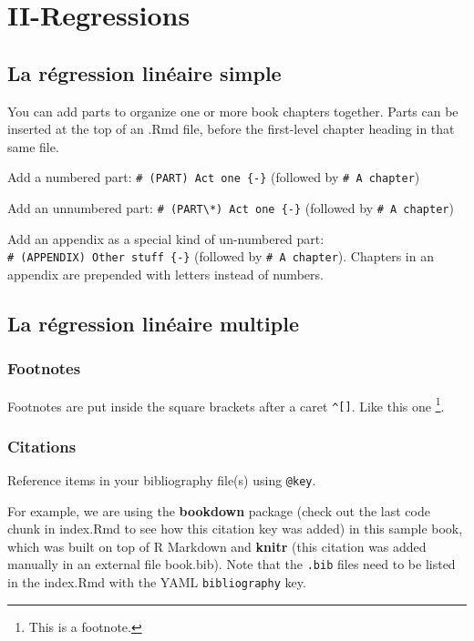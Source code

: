 \documentclass[
]{book}
\theoremstyle{definition}
\theoremstyle{definition}
\theoremstyle{definition}
\theoremstyle{definition}
\theoremstyle{remark}
\begin{document}
\hypertarget{part-ii-regressions}{%
\part{II-Regressions}\label{part-ii-regressions}}

\hypertarget{simple-lm}{%
\chapter{La régression linéaire simple}\label{simple-lm}}

You can add parts to organize one or more book chapters together. Parts can be inserted at the top of an .Rmd file, before the first-level chapter heading in that same file.

Add a numbered part: \texttt{\#\ (PART)\ Act\ one\ \{-\}} (followed by \texttt{\#\ A\ chapter})

Add an unnumbered part: \texttt{\#\ (PART\textbackslash{}*)\ Act\ one\ \{-\}} (followed by \texttt{\#\ A\ chapter})

Add an appendix as a special kind of un-numbered part: \texttt{\#\ (APPENDIX)\ Other\ stuff\ \{-\}} (followed by \texttt{\#\ A\ chapter}). Chapters in an appendix are prepended with letters instead of numbers.

\hypertarget{multiple-lm}{%
\chapter{La régression linéaire multiple}\label{multiple-lm}}

\hypertarget{footnotes}{%
\section{Footnotes}\label{footnotes}}

Footnotes are put inside the square brackets after a caret \texttt{\^{}{[}{]}}. Like this one \footnote{This is a footnote.}.

\hypertarget{citations}{%
\section{Citations}\label{citations}}

Reference items in your bibliography file(s) using \texttt{@key}.

For example, we are using the \textbf{bookdown} package \citep{R-bookdown} (check out the last code chunk in index.Rmd to see how this citation key was added) in this sample book, which was built on top of R Markdown and \textbf{knitr} \citep{xie2015} (this citation was added manually in an external file book.bib).
Note that the \texttt{.bib} files need to be listed in the index.Rmd with the YAML \texttt{bibliography} key.
\end{document}

